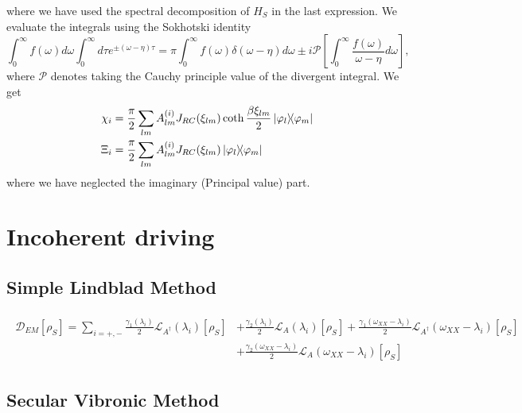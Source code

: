 \documentclass[]{article}
\begin{document}
where we have used the spectral decomposition of $H_S$ in the last expression. We evaluate the integrals using the Sokhotski identity
\begin{equation}
\label{eq:Sokhotski}
\int_{0}^{\infty}f(\omega)d\omega\int_{0}^{\infty}d\tau e^{\pm (\omega-\eta)\tau} = \pi\int_{0}^{\infty}f(\omega)\delta(\omega-\eta)d\omega \pm i \mathcal{P}\left[\int_{0}^{\infty}\frac{f(\omega)}{\omega-\eta}d\omega\right],
\end{equation}
where $\mathcal{P}$ denotes taking the Cauchy principle value of the divergent integral. We get 
\begin{align}
	\label{eq:NewRCOperators}
	\chi_i &= \frac{\pi}{2}\sum_{lm} A_{lm}^{(i)}  J_{RC}(\xi_{lm}) \coth\frac{\beta \xi_{lm}}{2}\dyad{\varphi_l}{\varphi_m}\\
	\Xi_i &= \frac{\pi}{2}\sum_{lm}A_{lm}^{(i)} J_{RC}(\xi_{lm})  \dyad{\varphi_l}{\varphi_m}
\end{align}
where we have neglected the imaginary (Principal value) part.
\section{Incoherent driving}
\subsection{Simple Lindblad Method}
\begin{align}
	\begin{split}
		\mathcal{D}_{EM}[\rho_S]=\sum_{i=+,-}\frac{\gamma_1(\lambda_i)}{2}\mathcal{L}_{A^{\dagger}}(\lambda_i)[\rho_S]&+\frac{\gamma_2(\lambda_i)}{2}\mathcal{L}_{A}(\lambda_i)[\rho_S]
		+\frac{\gamma_1(\omega_{XX}-\lambda_i)}{2}\mathcal{L}_{A^{\dagger}}(\omega_{XX}-\lambda_i)[\rho_S]\\ &+\frac{\gamma_2(\omega_{XX}-\lambda_i)}{2}\mathcal{L}_{A}(\omega_{XX}-\lambda_i)[\rho_S]
	\end{split}
\end{align}
\subsection{Secular Vibronic Method}
\end{document}
